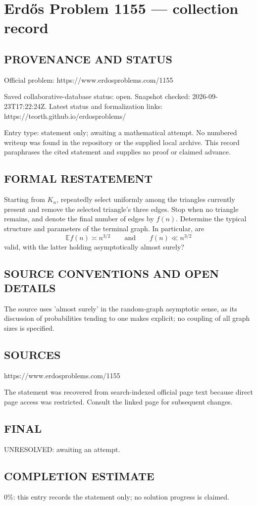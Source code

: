 \section*{Erd\H{o}s Problem 1155 --- collection record}

\subsection*{PROVENANCE AND STATUS}
Official problem: https://www.erdosproblems.com/1155

Saved collaborative-database status: open.
Snapshot checked: 2026-09-23T17:22:24Z.
Latest status and formalization links: https://teorth.github.io/erdosproblems/

Entry type: statement only; awaiting a mathematical attempt. No numbered writeup was found in the repository or the supplied local archive. This record paraphrases the cited statement and supplies no proof or claimed advance.

\subsection*{FORMAL RESTATEMENT}
Starting from $K_n$, repeatedly select uniformly among the triangles currently present and remove the selected triangle's three edges. Stop when no triangle remains, and denote the final number of edges by $f(n)$. Determine the typical structure and parameters of the terminal graph. In particular, are
\[
\mathbb E f(n)\asymp n^{3/2}\qquad\text{and}\qquad f(n)\ll n^{3/2}
\]
valid, with the latter holding asymptotically almost surely?

\subsection*{SOURCE CONVENTIONS AND OPEN DETAILS}
The source uses 'almost surely' in the random-graph asymptotic sense, as its discussion of probabilities tending to one makes explicit; no coupling of all graph sizes is specified.

\subsection*{SOURCES}
https://www.erdosproblems.com/1155

The statement was recovered from search-indexed official page text because direct page access was restricted. Consult the linked page for subsequent changes.

\subsection*{FINAL}
UNRESOLVED: awaiting an attempt.

\subsection*{COMPLETION ESTIMATE}
$0\%$: this entry records the statement only; no solution progress is claimed.
